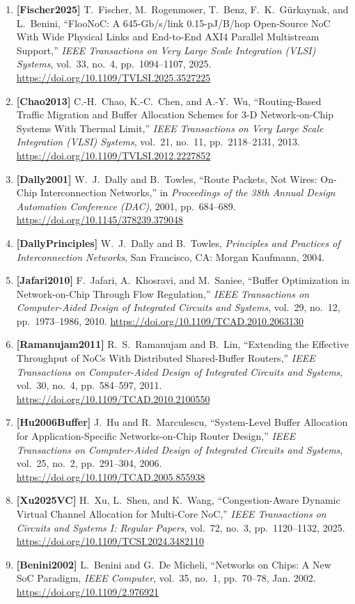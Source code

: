 \begin{enumerate}
    \item \textbf{[Fischer2025]} T.~Fischer, M.~Rogenmoser, T.~Benz, F.~K.~G{\"{u}}rkaynak, and L.~Benini, ``FlooNoC: A 645-Gb/s/link 0.15-pJ/B/hop Open-Source NoC With Wide Physical Links and End-to-End AXI4 Parallel Multistream Support,'' \emph{IEEE Transactions on Very Large Scale Integration (VLSI) Systems}, vol.~33, no.~4, pp.~1094--1107, 2025. \url{https://doi.org/10.1109/TVLSI.2025.3527225}
    \item \textbf{[Chao2013]} C.-H.~Chao, K.-C.~Chen, and A.-Y.~Wu, ``Routing-Based Traffic Migration and Buffer Allocation Schemes for 3-D Network-on-Chip Systems With Thermal Limit,'' \emph{IEEE Transactions on Very Large Scale Integration (VLSI) Systems}, vol.~21, no.~11, pp.~2118--2131, 2013. \url{https://doi.org/10.1109/TVLSI.2012.2227852}
    \item \textbf{[Dally2001]} W.~J.~Dally and B.~Towles, ``Route Packets, Not Wires: On-Chip Interconnection Networks,'' in \emph{Proceedings of the 38th Annual Design Automation Conference (DAC)}, 2001, pp.~684--689. \url{https://doi.org/10.1145/378239.379048}
    \item \textbf{[DallyPrinciples]} W.~J.~Dally and B.~Towles, \emph{Principles and Practices of Interconnection Networks}, San Francisco, CA: Morgan Kaufmann, 2004.
    \item \textbf{[Jafari2010]} F.~Jafari, A.~Khosravi, and M.~Saniee, ``Buffer Optimization in Network-on-Chip Through Flow Regulation,'' \emph{IEEE Transactions on Computer-Aided Design of Integrated Circuits and Systems}, vol.~29, no.~12, pp.~1973--1986, 2010. \url{https://doi.org/10.1109/TCAD.2010.2063130}
    \item \textbf{[Ramanujam2011]} R.~S.~Ramanujam and B.~Lin, ``Extending the Effective Throughput of NoCs With Distributed Shared-Buffer Routers,'' \emph{IEEE Transactions on Computer-Aided Design of Integrated Circuits and Systems}, vol.~30, no.~4, pp.~584--597, 2011. \url{https://doi.org/10.1109/TCAD.2010.2100550}
    \item \textbf{[Hu2006Buffer]} J.~Hu and R.~Marculescu, ``System-Level Buffer Allocation for Application-Specific Networks-on-Chip Router Design,'' \emph{IEEE Transactions on Computer-Aided Design of Integrated Circuits and Systems}, vol.~25, no.~2, pp.~291--304, 2006. \url{https://doi.org/10.1109/TCAD.2005.855938}
    \item \textbf{[Xu2025VC]} H.~Xu, L.~Shen, and K.~Wang, ``Congestion-Aware Dynamic Virtual Channel Allocation for Multi-Core NoC,'' \emph{IEEE Transactions on Circuits and Systems I: Regular Papers}, vol.~72, no.~3, pp.~1120--1132, 2025. \url{https://doi.org/10.1109/TCSI.2024.3482110}

    \item \textbf{[Benini2002]} L.~Benini and G.~De Micheli, ``Networks on Chips: A New SoC Paradigm, \emph{IEEE Computer}, vol.~35, no.~1, pp.~70--78, Jan. 2002. \url{https://doi.org/10.1109/2.976921}
\end{enumerate}
